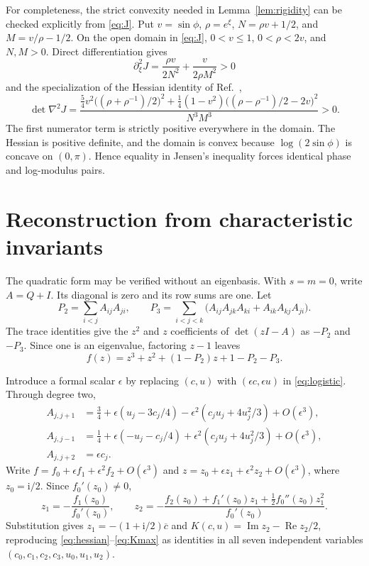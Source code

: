 \documentclass[11pt,a4paper]{article}
\newcommand{\Rea}{\operatorname{Re}}
\newcommand{\Ima}{\operatorname{Im}}
\newcommand{\av}[1]{\overline{#1}}
\newcommand{\ii}{\mathrm i}
\begin{document}
For completeness, the strict convexity needed in
Lemma~\ref{lem:rigidity} can be checked explicitly from \eqref{eq:J}.
Put $v=\sin\phi$, $\rho=e^\xi$, $N=\rho v+1/2$,
and $M=v/\rho-1/2$. On the open domain in \eqref{eq:J},
$0<v\leq1$, $0<\rho<2v$, and $N,M>0$. Direct differentiation gives
\begin{equation}
 \partial_\xi^2J=\frac{\rho v}{2N^2}+
                         \frac{v}{2\rho M^2}>0
\end{equation}
and the specialization of the Hessian identity of
Ref.~\cite[SM5]{Kolchinsky2026},
\begin{equation}\label{eq:detJ}
 \det\nabla^2J=
 \frac{\frac54v^2\bigl((\rho+\rho^{-1})/2\bigr)^2
 +\frac14(1-v^2)\bigl((\rho-\rho^{-1})/2-2v\bigr)^2}
 {N^3M^3}>0.
\end{equation}
The first numerator term is strictly positive everywhere in the domain.
The Hessian is positive definite, and the domain is convex because
$\log(2\sin\phi)$ is concave on $(0,\pi)$. Hence equality in Jensen's
inequality forces identical phase and log-modulus pairs.

\section{Reconstruction from characteristic invariants}\label{app:invariants}

The quadratic form may be verified without an eigenbasis. With $s=m=0$,
write $A=Q+I$. Its diagonal is zero and its row sums are one. Let
\begin{equation}
 P_2=\sum_{i<j}A_{ij}A_{ji},\qquad
 P_3=\sum_{i<j<k}\bigl(A_{ij}A_{jk}A_{ki}+A_{ik}A_{kj}A_{ji}\bigr).
\end{equation}
The trace identities give the $z^2$ and $z$ coefficients of
$\det(zI-A)$ as $-P_2$ and $-P_3$. Since one is an eigenvalue,
factoring $z-1$ leaves
\begin{equation}\label{eq:invariantcubic}
 f(z)=z^3+z^2+(1-P_2)z+1-P_2-P_3.
\end{equation}

Introduce a formal scalar $\epsilon$ by replacing $(c,u)$ with
$(\epsilon c,\epsilon u)$ in \eqref{eq:logistic}. Through degree two,
\begin{align}
 A_{j,j+1}&=\tfrac34+\epsilon(u_j-3c_j/4)
        -\epsilon^2(c_ju_j+4u_j^2/3)+O(\epsilon^3),\nonumber\\
 A_{j,j-1}&=\tfrac14+\epsilon(-u_j-c_j/4)
        +\epsilon^2(c_ju_j+4u_j^2/3)+O(\epsilon^3),\label{eq:intrinsic}\\
 A_{j,j+2}&=\epsilon c_j.\nonumber
\end{align}
Write $f=f_0+\epsilon f_1+\epsilon^2f_2+O(\epsilon^3)$ and
$z=z_0+\epsilon z_1+\epsilon^2z_2+O(\epsilon^3)$, where $z_0=\ii/2$.
Since $f_0'(z_0)\ne0$,
\begin{equation}\label{eq:implicit}
 z_1=-\frac{f_1(z_0)}{f_0'(z_0)},\qquad
 z_2=-\frac{f_2(z_0)+f_1'(z_0)z_1+\tfrac12f_0''(z_0)z_1^2}
                 {f_0'(z_0)}.
\end{equation}
Substitution gives $z_1=-(1+\ii/2)\av c$ and
$K(c,u)=\Ima z_2-\Rea z_2/2$, reproducing
\eqref{eq:hessian}--\eqref{eq:Kmax} as identities in all seven
independent variables $(c_0,c_1,c_2,c_3,u_0,u_1,u_2)$.
\end{document}
